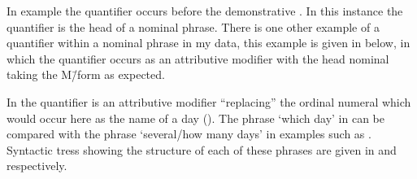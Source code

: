 In example  the quantifier  occurs
before the demonstrative .
In this instance the quantifier is the head of a nominal phrase.
There is one other example of a quantifier within a nominal phrase in my data,
this example is given in  below,
in which the quantifier occurs as an attributive modifier
with the head nominal taking the M\=/form as expected.

\begin{exe}
	\label{ex:130909-6, 1.26}
\end{exe}

In  the quantifier is an attributive modifier
``replacing'' the ordinal numeral which would occur here as the name of a day ().
The phrase  `which day' in 
can be compared with the phrase  `several/how many days'
in examples such as .
Syntactic tress showing the structure of each of these phrases
are given in  and  respectively.

\begin{multicols}{2}
	\begin{exe}
		\label{tr:NeanFauk}
	\end{exe}
	\begin{exe}
		\label{tr:NenoFauk}
	\end{exe}
\end{multicols}


